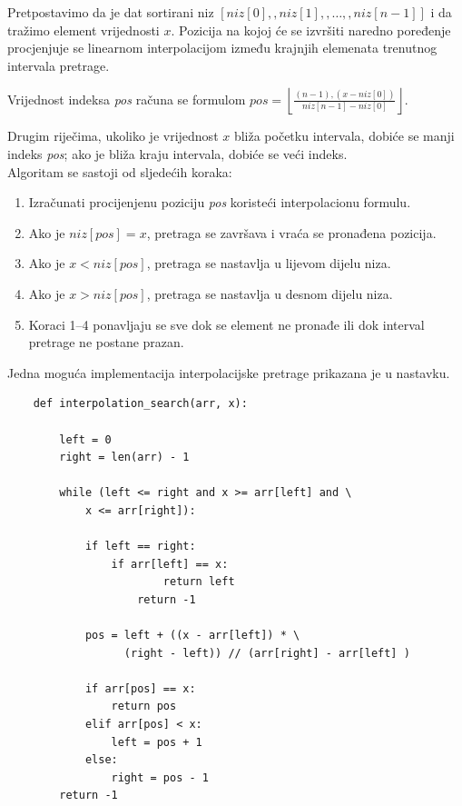 Pretpostavimo da je dat sortirani niz $[ niz[0],, niz[1],, \ldots,, niz[n-1] ]$ i da tražimo element vrijednosti $x$. Pozicija na kojoj će se izvršiti naredno poređenje procjenjuje se linearnom interpolacijom između krajnjih elemenata trenutnog intervala pretrage.

Vrijednost indeksa \textit{pos} računa se formulom $
pos=
\left\lfloor
\frac{(n-1),(x-niz[0])}
{niz[n-1]-niz[0]}
\right\rfloor .
$

Drugim riječima, ukoliko je vrijednost $x$ bliža početku intervala, dobiće se manji indeks \textit{pos}; ako je bliža kraju intervala, dobiće se veći indeks.\\

Algoritam se sastoji od sljedećih koraka:

\begin{enumerate}
	\item Izračunati procijenjenu poziciju \textit{pos} koristeći interpolacionu formulu.
	
	\item Ako je $niz[pos] = x$, pretraga se završava i vraća se pronađena pozicija.
	
	\item Ako je $x < niz[pos]$, pretraga se nastavlja u lijevom dijelu niza.
	
	\item Ako je $x > niz[pos]$, pretraga se nastavlja u desnom dijelu niza.
	
	\item Koraci 1--4 ponavljaju se sve dok se element ne pronađe ili dok interval pretrage ne postane prazan.
	
\end{enumerate}

Jedna moguća implementacija interpolacijske pretrage prikazana je u nastavku.

\begin{verbatim}
	def interpolation_search(arr, x):
	
	    left = 0
	    right = len(arr) - 1
	
	    while (left <= right and x >= arr[left] and \ 
	        x <= arr[right]):
	
	        if left == right:
	            if arr[left] == x:
	                    return left
	                return -1
	
	        pos = left + ((x - arr[left]) * \ 
	              (right - left)) // (arr[right] - arr[left] )
	
	        if arr[pos] == x:
	            return pos
	        elif arr[pos] < x:
	            left = pos + 1
	        else:
	            right = pos - 1
	    return -1
	
\end{verbatim}

